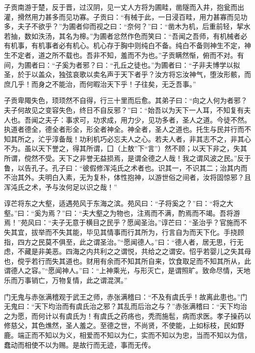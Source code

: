 \documentclass[]{article}
\begin{document}
子贡南游于楚，反于晋，过汉阴，见一丈人方将为圃畦，凿隧而入井，抱瓮而出灌，搰然用力甚多而见功寡。子贡曰：``有械于此，一日浸百畦，用力甚寡而见功多，夫子不欲乎？''为圃者仰而视之曰：``奈何？''曰：``凿木为机，后重前轻，挈水若抽，数如泆汤，其名为槔。''为圃者忿然作色而笑曰：``吾闻之吾师，有机械者必有机事，有机事者必有机心。机心存于胸中则纯白不备。纯白不备则神生不定，神生不定者，道之所不载也。吾非不知，羞而不为也。''子贡瞒然惭，俯而不对。有间，为圃者曰：``子奚为者邪？曰：``孔丘之徒也。''为圃者曰：``子非夫博学以拟圣，於于以盖众，独弦哀歌以卖名声于天下者乎？汝方将忘汝神气，堕汝形骸，而庶几乎！而身之不能治，而何暇治天下乎！子往矣，无乏吾事。''

子贡卑陬失色，顼顼然不自得，行三十里而后愈。其弟子曰：``向之人何为者邪？夫子何故见之变容失色，终日不自反邪？''曰：``始吾以为天下一人耳，不知复有夫人也。吾闻之夫子：事求可，功求成，用力少，见功多者，圣人之道。今徒不然。执道者德全，德全者形全，形全者神全。神全者，圣人之道也。托生与民并行而不知其所之，汒乎淳备哉！功利机巧必忘夫人之心。若夫人者，非其志不之，非其心不为。虽以天下誉之，得其所谓，囗（上敖''下``言''）然不顾；以天下非之，失其所谓，傥然不受。天下之非誉无益损焉，是谓全德之人哉！我之谓风波之民。''反于鲁，以告孔子。孔子曰：``彼假修浑沌氏之术者也。识其一，不识其二；治其内而不治其外。夫明白入素，无为复朴，体性抱神，以游世俗之间者，汝将固惊邪？且浑沌氏之术，予与汝何足以识之哉！''

谆芒将东之大壑，适遇苑风于东海之滨。苑风曰：``子将奚之？''曰：``将之大壑。''曰：``奚为焉？''曰：``夫大壑之为物也，注焉而不满，酌焉而不竭。吾将游焉！''苑风曰：``夫子无意于横目之民乎？愿闻圣治。''谆芒曰：``圣治乎？官施而不失其宜，拔举而不失其能，毕见其情事而行其所为，行言自为而天下化。手挠顾指，四方之民莫不俱至，此之谓圣治。''``愿闻德人。''曰：``德人者，居无思，行无虑，不藏是非美恶。四海之内共利之之谓悦，共给之之谓安。怊乎若婴儿之失其母也，傥乎若行而失其道也。财用有余而不知其所自来，饮食取足而不知其所从，此谓德人之容。''``愿闻神人。''曰：``上神乘光，与形灭亡，是谓照旷。致命尽情，天地乐而万事销亡，万物复情，此之谓混溟。''

门无鬼与赤张满稽观于武王之师，赤张满稽曰：``不及有虞氏乎！故离此患也。''门无鬼曰：``天下均治而有虞氏治之邪？其乱而后治之与？''赤张满稽曰：``天下均治之为愿，而何计以有虞氏为！有虞氏之药疡也，秃而施髢，病而求医。孝子操药以修慈父，其色燋然，圣人羞之。至德之世，不尚贤，不使能，上如标枝，民如野鹿。端正而不知以为义，相爱而不知以为仁，实而不知以为忠，当而不知以为信，蠢动而相使不以为赐。是故行而无迹，事而无传。
\end{document}
